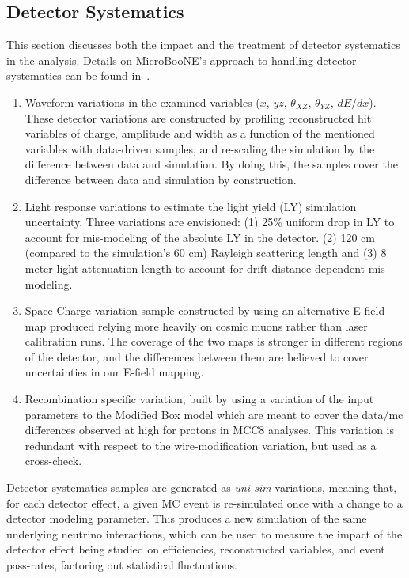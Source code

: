 \subsection{Detector Systematics}
\label{sec:detsys}
\par This section discusses both the impact and the treatment of detector systematics in the analysis. Details on MicroBooNE's approach to handling detector systematics can be found in~\cite{bib:detsyssupportnote}. 
\begin{enumerate}
    \item Waveform variations in the examined variables ($x$, $yz$, $\theta_{XZ}$, $\theta_{YZ}$, $dE/dx$). These detector variations are constructed by profiling reconstructed hit variables of charge, amplitude and width as a function of the mentioned variables with data-driven samples, and re-scaling the simulation by the difference between data and simulation. By doing this, the samples cover the difference between data and simulation by construction. 
    \item Light response variations to estimate the light yield (LY) simulation uncertainty. Three variations are envisioned: (1) 25\% uniform drop in LY to account for mis-modeling of the absolute LY in the detector. (2) 120 cm (compared to the simulation's 60 cm) Rayleigh scattering length and (3) 8 meter light attenuation length to account for drift-distance dependent mis-modeling.
    \item Space-Charge variation sample constructed by using an alternative E-field map produced relying more heavily on cosmic muons rather than laser calibration runs. The coverage of the two maps is stronger in different regions of the detector, and the differences between them are believed to cover uncertainties in our E-field mapping. 
    \item Recombination specific variation, built by using a variation of the input parameters to the Modified Box model which are meant to cover the data/mc differences observed at high \dedx for protons in MCC8 analyses. This variation is redundant with respect to the wire-modification \dedx variation, but used as a cross-check. 
\end{enumerate}
\par Detector systematics samples are generated as \emph{uni-sim} variations, meaning that, for each detector effect, a given MC event is re-simulated once with a change to a detector modeling parameter. This produces a new simulation of the same underlying neutrino interactions, which can be used to measure the impact of the detector effect being studied on efficiencies, reconstructed variables, and event pass-rates, factoring out statistical fluctuations.
